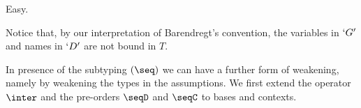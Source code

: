 \documentclass{lmcs}
\newcommand{\Comment}[1]{}
\begin{document}
 \begin{Proof} Easy. 
 \end{Proof}

Notice that, by our interpretation of Barendregt's convention, the variables in $`G'$ and names in $`D'$ are not bound in $T$.

\Comment{%
 \begin{rem}
Notice that weakening is only sound when extending Barendregt's convention to judgements.
If we would not do so, then, for example, we could derive
%
 \[ \begin{array}{c}
\Inf	[\Weak]
	{\Inf	[\LAbs]
{\Inf	[\Ax]
	{ \derLmu x{:}`k\arrow `r |- x : `k\arrow `r | {} }
}{ \derLmu {} |- `lx.x : (`k\arrow `r)\prod `k\arrow `r | {} }
	}{ \derLmu x{:}`d |- `lx.x : (`k\arrow `r)\prod `k\arrow `r | {} }
 \end{array} \]

Note that we cannot apply rule $(\LAbs)$ to this derivation, since that would create the term $`lx.`lx.x$, which is not a valid term.
We can solve this through $`a$-conversion, replacing $`lx.x$ by $`ly.y$; 
%
 \[ \begin{array}{c}
\Inf	[\Weak]
	{\Inf	[\LAbs]
{\Inf	[\Ax]
	{ \derLmu y{:}`k\arrow `r |- y : `k\arrow `r | {} }
}{ \derLmu {} |- `ly.y : (`k\arrow `r)\prod `k\arrow `r | {} }
	}{ \derLmu x{:}`d |- `ly.y : (`k\arrow `r)\prod `k\arrow `r | {} }
 \end{array} \]
notice that then the application of rule $(\Weak)$ is valid according to our criteria.
 \end{rem}
}%

In presence of the subtyping $(\seq)$ we can have a further form of weakening, namely by weakening the types in the assumptions. 
We first extend the operator $\inter$ and the pre-orders $\seqD$ and $\seqC$ to bases and contexts.
\end{document}
